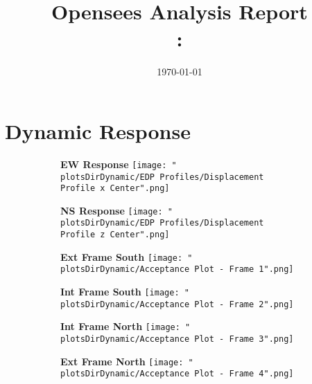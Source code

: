 \documentclass[12pt]{article} %
\begin{document}
	\title{Opensees Analysis Report\\
	\Large \modelName: \analysisName}
	\date{\today}
	\maketitle
	
	\section{Dynamic Response}
	
		\begin{figure}[h]
			\centering
			\begin{subfigure}{.49\textwidth}
				\centering
				\textbf{EW Response}
				\texttt{[image: "\\plotsDirDynamic/EDP Profiles/Displacement Profile x Center".png]}
			\end{subfigure}
			\begin{subfigure}{.49\textwidth}
				\centering
				\textbf{NS Response}
				\texttt{[image: "\\plotsDirDynamic/EDP Profiles/Displacement Profile z Center".png]}
			\end{subfigure}
		\end{figure}
		\pagebreak
		
		\begin{figure}[h]
			\centering
			\begin{subfigure}{.49\textwidth}
				\centering
				\textbf{Ext Frame South}
				\texttt{[image: "\\plotsDirDynamic/Acceptance Plot - Frame 1".png]}
			\end{subfigure}
			\begin{subfigure}{.49\textwidth}
				\centering
				\textbf{Int Frame South}
				\texttt{[image: "\\plotsDirDynamic/Acceptance Plot - Frame 2".png]}
			\end{subfigure}
		\end{figure}
		\begin{figure}[h]
			\centering
			\begin{subfigure}{.49\textwidth}
				\centering
				\textbf{Int Frame North}
				\texttt{[image: "\\plotsDirDynamic/Acceptance Plot - Frame 3".png]}
			\end{subfigure}
			\begin{subfigure}{.49\textwidth}
				\centering
				\textbf{Ext Frame North}
				\texttt{[image: "\\plotsDirDynamic/Acceptance Plot - Frame 4".png]}
			\end{subfigure}
		\end{figure}
		\pagebreak
		
\end{document}
